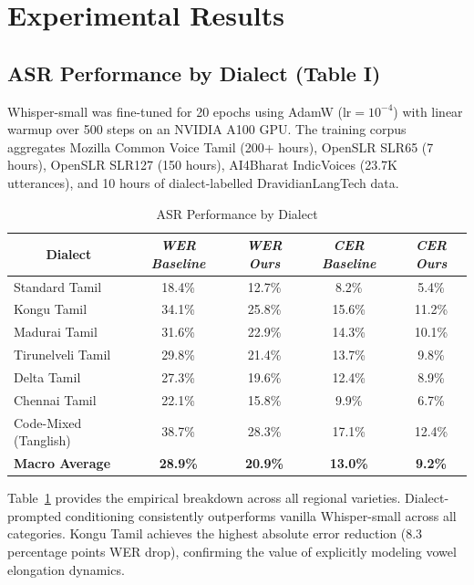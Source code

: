 \documentclass[conference]{IEEEtran}
\begin{document}
\section{Experimental Results}

\subsection{ASR Performance by Dialect (Table I)}
Whisper-small was fine-tuned for 20 epochs using AdamW ($\text{lr} = 10^{-4}$) with linear warmup over 500 steps on an NVIDIA A100 GPU. The training corpus aggregates Mozilla Common Voice Tamil (200+ hours), OpenSLR SLR65 (7 hours), OpenSLR SLR127 (150 hours), AI4Bharat IndicVoices (23.7K utterances), and 10 hours of dialect-labelled DravidianLangTech data.

\begin{table}[t]
\centering
\caption{ASR Performance by Dialect}
\label{tab:asr_performance_by_dialect}
\begin{tabular}{|l|c|c|c|c|}
\hline
\multicolumn{1}{|c|}{\textbf{Dialect}} & \textit{WER Baseline} & \textit{WER Ours} & \textit{CER Baseline} & \textit{CER Ours} \\
\hline
Standard Tamil      & 18.4\% & 12.7\% & 8.2\%  & 5.4\%  \\
\hline
Kongu Tamil         & 34.1\% & 25.8\% & 15.6\% & 11.2\% \\
\hline
Madurai Tamil       & 31.6\% & 22.9\% & 14.3\% & 10.1\% \\
\hline
Tirunelveli Tamil   & 29.8\% & 21.4\% & 13.7\% & 9.8\%  \\
\hline
Delta Tamil         & 27.3\% & 19.6\% & 12.4\% & 8.9\%  \\
\hline
Chennai Tamil       & 22.1\% & 15.8\% & 9.9\%  & 6.7\%  \\
\hline
Code-Mixed (Tanglish) & 38.7\% & 28.3\% & 17.1\% & 12.4\% \\
\hline
\textbf{Macro Average} & \textbf{28.9\%} & \textbf{20.9\%} & \textbf{13.0\%} & \textbf{9.2\%} \\
\hline
\end{tabular}
\end{table}

Table~\ref{tab:asr_performance_by_dialect} provides the empirical breakdown across all regional varieties. Dialect-prompted conditioning consistently outperforms vanilla Whisper-small across all categories. Kongu Tamil achieves the highest absolute error reduction (8.3 percentage points WER drop), confirming the value of explicitly modeling vowel elongation dynamics.
\end{document}
